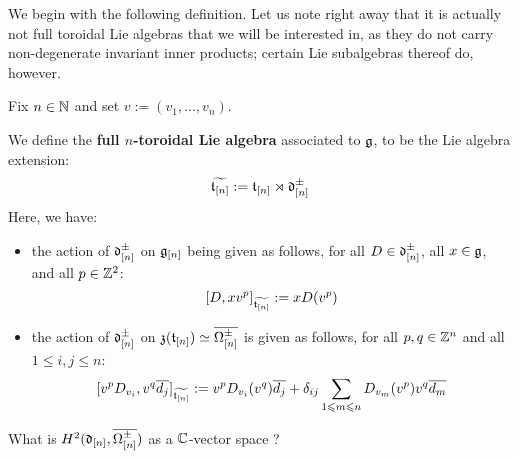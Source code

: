             We begin with the following definition. Let us note right away that it is actually not full toroidal Lie algebras that we will be interested in, as they do not carry non-degenerate invariant inner products; certain Lie subalgebras thereof do, however. 
            \begin{definition} \label{def: full_toroidal_lie_algebras}
                Fix $n \in \mathbb{N}$ and set $v := (v_1, ..., v_n)$.
            
                We define the \textbf{full $n$-toroidal Lie algebra} associated to $\mathfrak{g}$, to be the Lie algebra extension:
                    $$\widetilde{\mathfrak{t}_{[n]}} := \mathfrak{t}_{[n]} \rtimes \mathfrak{d}_{[n]}^{\pm}$$
                Here, we have:
                    \begin{itemize}
                        \item the action of $\mathfrak{d}_{[n]}^{\pm}$ on $\mathfrak{g}_{[n]}$ being given as follows, for all $D \in \mathfrak{d}_{[n]}^{\pm}$, all $x \in \mathfrak{g}$, and all $p \in \mathbb{Z}^2$:
                    $$[D, x v^p]_{ \widetilde{\mathfrak{t}_{[n]}} } := x D( v^p )$$
                        \item the action of $\mathfrak{d}_{[n]}^{\pm}$ on $\mathfrak{z}(\mathfrak{t}_{[n]}) \simeq \overline{\Omega^{\pm}_{[n]}}$ is given as follows, for all $p, q \in \mathbb{Z}^n$ and all $1 \leq i, j \leq n$:
                            $$[ v^p D_{v_i}, v^q \overline{d_j} ]_{\widetilde{\mathfrak{t}_{[n]}}} := v^p D_{v_i}(v^q) \overline{d_j} + \delta_{ij} \sum_{1 \leqslant m \leqslant n} D_{v_m}(v^p) v^q \overline{d_m}$$
                    \end{itemize}
            \end{definition}
            \begin{question} \label{question: non_uniqueness_of_full_toroidal_lie_algebras}
                What is $H^2( \mathfrak{d}_{[n]}, \overline{\Omega^{\pm}_{[n]}} )$ as a $\mathbb{C}$-vector space ? 
            \end{question}
            
